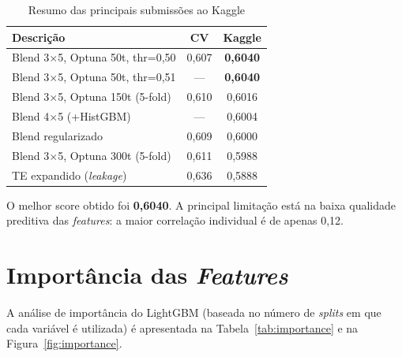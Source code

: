 \documentclass[12pt, a4paper]{article}
\begin{document}
\begin{table}[H]
  \centering
  \caption{Resumo das principais submissões ao Kaggle}
  \label{tab:submissoes}
  \small{}
  \begin{tabular}{p{7cm}cc}
    \toprule
    \rowcolor{headerblue}
    \color{white}\textbf{Descrição} & \color{white}\textbf{CV} & \color{white}\textbf{Kaggle} \\
    \midrule
    Blend 3$\times$5, Optuna 50t, thr=0,50     & 0,607 & \textbf{0,6040} \\
    Blend 3$\times$5, Optuna 50t, thr=0,51     & ---   & \textbf{0,6040} \\
    Blend 3$\times$5, Optuna 150t (5-fold)      & 0,610 & 0,6016 \\
    Blend 4$\times$5 (+HistGBM)                 & ---   & 0,6004 \\
    Blend regularizado                          & 0,609 & 0,6000 \\
    Blend 3$\times$5, Optuna 300t (5-fold)      & 0,611 & 0,5988 \\
    TE expandido (\textit{leakage})             & 0,636 & 0,5888 \\
    \bottomrule
  \end{tabular}
\end{table}

O melhor score obtido foi \textbf{0,6040}. A principal limitação está na baixa qualidade preditiva das \textit{features}: a maior correlação individual é de apenas 0,12.

\section{Importância das \textit{Features}}

A análise de importância do LightGBM (baseada no número de \textit{splits} em que cada variável é utilizada) é apresentada na Tabela~\ref{tab:importance} e na Figura~\ref{fig:importance}.
\end{document}

